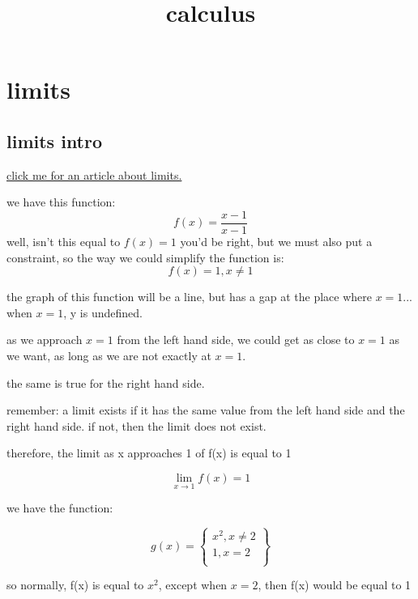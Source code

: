 \documentclass[11pt,a4paper]{article}
\title{calculus}
\author{}
\date{}
\begin{document}
\maketitle
\centering

\vspace{20pt}

\tableofcontents

\pagebreak

\section{limits}

\subsection{limits intro}

\href{https://khanacademy.org/math/ap-calculus-ab/ab-limits-new/ab-1-2/a/limits-intro}{click me for an article about limits.}

\vspace{30pt}

we have this function:
$$f(x)=\frac{x-1}{x-1}$$
well, isn't this equal to $f(x)=1$
you'd be right, but we must also put a constraint, so the way we could simplify the function is:
$$f(x)=1,x \neq 1$$

the graph of this function will be a line, but has a gap at the place where $x=1$... when $x=1$, y is undefined.

as we approach $x=1$ from the left hand side, we could get as close to $x=1$ as we want, as long as we are not exactly at $x=1$.

the same is true for the right hand side.

remember: a limit exists if it has the same value from the left hand side and the right hand side. if not, then the limit does not exist.

therefore, the limit as x approaches 1 of f(x) is equal to 1

$$\lim \limits_{x \to 1} f(x) = 1$$

\vspace{30pt}

we have the function:

$$g(x) = \left\{ \begin{array}{l}
  x^2,x\neq 2 \\
  1, x=2 \\
\end{array} \right \}$$

so normally, f(x) is equal to $x^2$, except when $x=2$, then f(x) would be equal to 1
\end{document}
